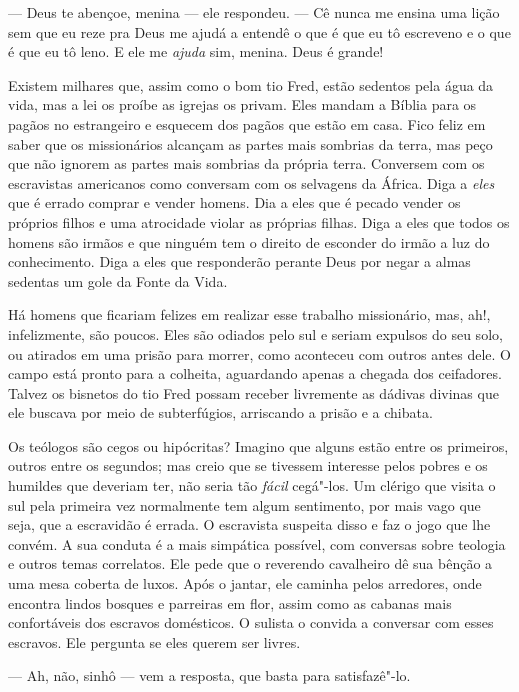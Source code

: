 --- Deus te abençoe, menina --- ele
respondeu. --- Cê nunca me ensina uma lição sem que eu reze pra Deus me
ajudá a entendê o que é que eu tô escreveno e o que é que eu tô leno. E
ele me \emph{ajuda} sim, menina. Deus é grande!

Existem milhares que, assim como o bom
tio Fred, estão sedentos pela água da vida, mas a lei os proíbe as
igrejas os privam. Eles mandam a Bíblia para os pagãos no estrangeiro e
esquecem dos pagãos que estão em casa. Fico feliz em saber que os
missionários alcançam as partes mais sombrias da terra, mas peço que não
ignorem as partes mais sombrias da própria terra. Conversem com os
escravistas americanos como conversam com os selvagens da África. Diga a
\emph{eles} que é errado comprar e vender homens. Dia a eles que é
pecado vender os próprios filhos e uma atrocidade violar as próprias
filhas. Diga a eles que todos os homens são irmãos e que ninguém tem o
direito de esconder do irmão a luz do conhecimento. Diga a eles que
responderão perante Deus por negar a almas sedentas um gole da Fonte da
Vida.

Há homens que ficariam felizes em
realizar esse trabalho missionário, mas, ah!, infelizmente, são poucos.
Eles são odiados pelo sul e seriam expulsos do seu solo, ou atirados em
uma prisão para morrer, como aconteceu com outros antes dele. O campo
está pronto para a colheita, aguardando apenas a chegada dos ceifadores.
Talvez os bisnetos do tio Fred possam receber livremente as dádivas
divinas que ele buscava por meio de subterfúgios, arriscando a prisão e
a chibata.

Os teólogos são cegos ou hipócritas?
Imagino que alguns estão entre os primeiros, outros entre os segundos;
mas creio que se tivessem interesse pelos pobres e os humildes que
deveriam ter, não seria tão \emph{fácil} cegá"-los. Um clérigo que visita
o sul pela primeira vez normalmente tem algum sentimento, por mais vago
que seja, que a escravidão é errada. O escravista suspeita disso e faz o
jogo que lhe convém. A sua conduta é a mais simpática possível, com
conversas sobre teologia e outros temas correlatos. Ele pede que o
reverendo cavalheiro dê sua bênção a uma mesa coberta de luxos. Após o
jantar, ele caminha pelos arredores, onde encontra lindos bosques e
parreiras em flor, assim como as cabanas mais confortáveis dos escravos
domésticos. O sulista o convida a conversar com esses escravos. Ele
pergunta se eles querem ser livres.

--- Ah, não, sinhô --- vem a resposta, que basta para satisfazê"-lo.

